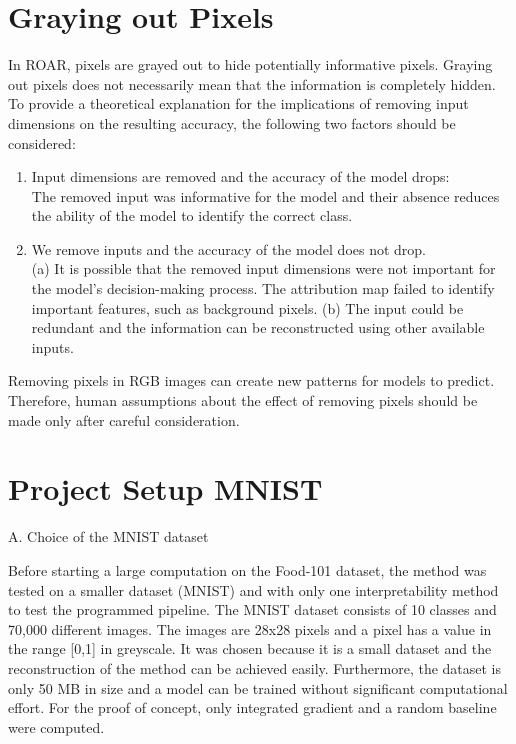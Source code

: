 \section{Graying out Pixels}
\label{gray}
In ROAR, pixels are grayed out to hide potentially informative pixels. Graying out pixels does not necessarily mean that the information is completely hidden. To provide a theoretical explanation for the implications of removing input dimensions on the resulting accuracy, the following two factors\cite{hooker2019benchmark} should be considered:

\begin{enumerate}
	\item Input dimensions are removed and the accuracy of the model drops:\\ The removed input was informative for the model and their absence reduces the ability of the model to identify the correct class.
	
	\item We remove inputs and the accuracy of the model does not drop.\\ (a) It is possible that the removed input dimensions were not important for the model’s decision-making process. The attribution map failed to identify important features, such as background pixels. (b) The input could be redundant and the information can be reconstructed using other available inputs. 
\end{enumerate}

Removing pixels in RGB images can create new patterns for models to predict. Therefore, human assumptions about the effect of removing pixels should be made only after careful consideration.


\section{Project Setup MNIST}
\label{sec:MNIST}

A. Choice of the MNIST dataset

Before starting a large computation on the Food-101 dataset, the method was tested on a smaller dataset (MNIST) and with only one interpretability method to test the programmed pipeline. The MNIST dataset consists of 10 classes and 70,000 different images. The images are 28x28 pixels and a pixel has a value in the range [0,1] in greyscale. It was chosen because it is a small dataset and the reconstruction of the method can be achieved easily. Furthermore, the dataset is only 50 MB in size and a model can be trained without significant computational effort. For the proof of concept, only integrated gradient \cite{sundararajan2017axiomatic} and a random baseline were computed.

